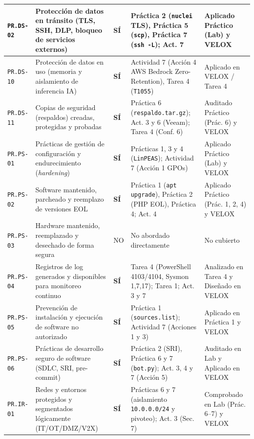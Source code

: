\documentclass[letterpaper,11pt]{article}
\begin{document}
\begin{longtable}{|C{1.4cm}|L{5.4cm}|C{1.3cm}|L{4.3cm}|C{4.2cm}|}
\texttt{PR.DS-02} & Protección de datos en tránsito (TLS, SSH, DLP, bloqueo de servicios externos) & \textbf{SÍ} & Práctica 2 (\texttt{nuclei} TLS), Práctica 5 (\texttt{scp}), Práctica 7 (\texttt{ssh -L}); Act. 7 & Aplicado Práctico (Lab) y VELOX \\
\hline
\texttt{PR.DS-10} & Protección de datos en uso (memoria y aislamiento de inferencia IA) & \textbf{SÍ} & Actividad 7 (Acción 4 AWS Bedrock Zero-Retention), Tarea 4 (\texttt{T1055}) & Aplicado en VELOX / Tarea 4 \\
\hline
\texttt{PR.DS-11} & Copias de seguridad (respaldos) creadas, protegidas y probadas & \textbf{SÍ} & Práctica 6 (\texttt{respaldo.tar.gz}); Act. 3 y 6 (Veeam); Tarea 4 (Conf. 6) & Auditado Práctico (Prác. 6) y VELOX \\
\hline
\texttt{PR.PS-01} & Prácticas de gestión de configuración y endurecimiento (\textit{hardening}) & \textbf{SÍ} & Prácticas 1, 3 y 4 (\texttt{LinPEAS}); Actividad 7 (Acción 1 GPOs) & Aplicado Práctico (Lab) y VELOX \\
\hline
\texttt{PR.PS-02} & Software mantenido, parcheado y reemplazo de versiones EOL & \textbf{SÍ} & Práctica 1 (\texttt{apt upgrade}), Práctica 2 (PHP EOL), Práctica 4; Act. 4 & Aplicado Práctico (Prác. 1, 2, 4) y VELOX \\
\hline
\texttt{PR.PS-03} & Hardware mantenido, reemplazado y desechado de forma segura & NO & No abordado directamente & No cubierto \\
\hline
\texttt{PR.PS-04} & Registros de log generados y disponibles para monitoreo continuo & \textbf{SÍ} & Tarea 4 (PowerShell 4103/4104, Sysmon 1,7,17); Tarea 1; Act. 3 y 7 & Analizado en Tarea 4 y Diseñado en VELOX \\
\hline
\texttt{PR.PS-05} & Prevención de instalación y ejecución de software no autorizado & \textbf{SÍ} & Práctica 1 (\texttt{sources.list}); Actividad 7 (Acciones 1 y 3) & Aplicado en Práctica 1 y VELOX \\
\hline
\texttt{PR.PS-06} & Prácticas de desarrollo seguro de software (SDLC, SRI, pre-commit) & \textbf{SÍ} & Práctica 2 (SRI), Práctica 6 y 7 (\texttt{bot.py}); Act. 3, 4 y 7 (Acción 5) & Auditado en Lab y Aplicado en VELOX \\
\hline
\texttt{PR.IR-01} & Redes y entornos protegidos y segmentados lógicamente (IT/OT/DMZ/V2X) & \textbf{SÍ} & Prácticas 6 y 7 (aislamiento \texttt{10.0.0.0/24} y pivoteo); Act. 3 (Sec. 7) & Comprobado en Lab (Prác. 6--7) y VELOX \\

\end{longtable}
\end{document}
